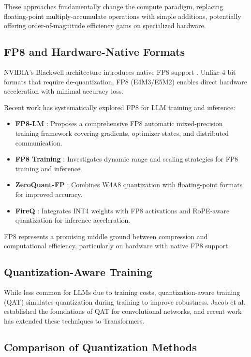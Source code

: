 \documentclass[11pt]{article}
\begin{document}
These approaches fundamentally change the compute paradigm, replacing floating-point multiply-accumulate operations with simple additions, potentially offering order-of-magnitude efficiency gains on specialized hardware.

\subsection{FP8 and Hardware-Native Formats}

NVIDIA's Blackwell architecture introduces native FP8 support \cite{nvidia2024blackwell, micikevicius2022fp8}. Unlike 4-bit formats that require de-quantization, FP8 (E4M3/E5M2) enables direct hardware acceleration with minimal accuracy loss.

Recent work has systematically explored FP8 for LLM training and inference:
\begin{itemize}
    \item \textbf{FP8-LM} \cite{peng2023fp8lm}: Proposes a comprehensive FP8 automatic mixed-precision training framework covering gradients, optimizer states, and distributed communication.
    \item \textbf{FP8 Training} \cite{noune2023fp8training}: Investigates dynamic range and scaling strategies for FP8 training and inference.
    \item \textbf{ZeroQuant-FP} \cite{wu2023zeroquantfp}: Combines W4A8 quantization with floating-point formats for improved accuracy.
    \item \textbf{FireQ} \cite{liu2025fireq}: Integrates INT4 weights with FP8 activations and RoPE-aware quantization for inference acceleration.
\end{itemize}

FP8 represents a promising middle ground between compression and computational efficiency, particularly on hardware with native FP8 support.

\subsection{Quantization-Aware Training}

While less common for LLMs due to training costs, quantization-aware training (QAT) simulates quantization during training to improve robustness. Jacob et al. \cite{jacob2018quantization} established the foundations of QAT for convolutional networks, and recent work has extended these techniques to Transformers.

\subsection{Comparison of Quantization Methods}
\end{document}
